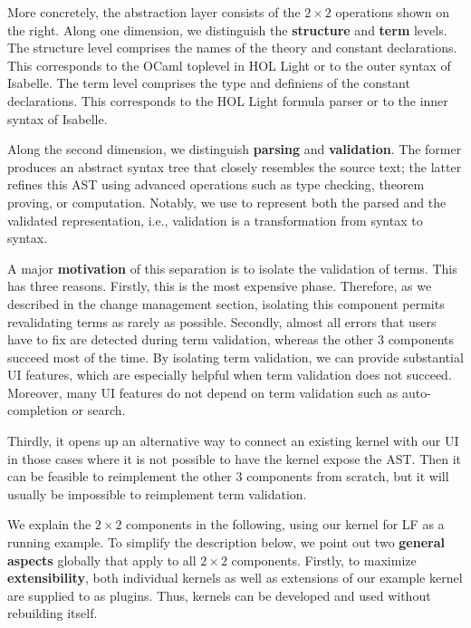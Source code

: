 More concretely, the abstraction layer consists of the $2\times 2$ operations shown on the right.
Along one dimension, we distinguish the \textbf{structure} and \textbf{term} levels.
The structure level comprises the names of the theory and constant declarations.
This corresponds to the OCaml toplevel in HOL Light \cite{hollight} or to the outer syntax of Isabelle.
The term level comprises the type and definiens of the constant declarations.
This corresponds to the HOL Light formula parser or to the inner syntax of Isabelle.

Along the second dimension, we distinguish \textbf{parsing} and \textbf{validation}.
The former produces an abstract syntax tree that closely resembles the source text;
the latter refines this AST using advanced operations such as type checking, theorem proving, or computation.
Notably, we use \mmt to represent both the parsed and the validated representation, i.e., validation is a transformation from \mmt syntax to \mmt syntax.




A major \textbf{motivation} of this separation is to isolate the validation of terms.
This has three reasons.
Firstly, this is the most expensive phase.
Therefore, as we described in the change management section, isolating this component permits revalidating terms as rarely as possible.
Secondly, almost all errors that users have to fix are detected during term validation, whereas the other $3$ components succeed most of the time.
By isolating term validation, we can provide substantial UI features, which are especially helpful when term validation does not succeed.
Moreover, many UI features do not depend on term validation such as auto-completion or search.


Thirdly, it opens up an alternative way to connect an existing kernel with our UI in those cases where it is not possible to have the kernel expose the AST.
Then it can be feasible to reimplement the other $3$ components from scratch, but it will usually be impossible to reimplement term validation.

We explain the $2\times 2$ components in the following, using our kernel for LF as a running example.
To simplify the description below, we point out two \textbf{general aspects} globally that apply to all $2\times 2$ components.
Firstly, to maximize \textbf{extensibility}, both individual kernels as well as extensions of our example kernel are supplied to \jmmt as plugins.
Thus, kernels can be developed and used without rebuilding \jmmt itself.

